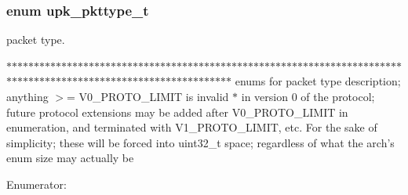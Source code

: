 \subsubsection[{upk\_\-pkttype\_\-t}]{\setlength{\rightskip}{0pt plus 5cm}enum {\bf upk\_\-pkttype\_\-t}}\label{group__client__protocol_ga434039581eb81ed8ad335ab19ad1d126}


packet type. 

$\ast$$\ast$$\ast$$\ast$$\ast$$\ast$$\ast$$\ast$$\ast$$\ast$$\ast$$\ast$$\ast$$\ast$$\ast$$\ast$$\ast$$\ast$$\ast$$\ast$$\ast$$\ast$$\ast$$\ast$$\ast$$\ast$$\ast$$\ast$$\ast$$\ast$$\ast$$\ast$$\ast$$\ast$$\ast$$\ast$$\ast$$\ast$$\ast$$\ast$$\ast$$\ast$$\ast$$\ast$$\ast$$\ast$$\ast$$\ast$$\ast$$\ast$$\ast$$\ast$$\ast$$\ast$$\ast$$\ast$$\ast$$\ast$$\ast$$\ast$$\ast$$\ast$$\ast$$\ast$$\ast$$\ast$$\ast$$\ast$$\ast$$\ast$$\ast$$\ast$$\ast$$\ast$$\ast$$\ast$$\ast$$\ast$$\ast$$\ast$$\ast$$\ast$$\ast$$\ast$$\ast$$\ast$$\ast$$\ast$$\ast$$\ast$$\ast$$\ast$$\ast$$\ast$$\ast$$\ast$$\ast$$\ast$$\ast$$\ast$$\ast$$\ast$$\ast$$\ast$$\ast$$\ast$$\ast$$\ast$$\ast$$\ast$$\ast$$\ast$$\ast$ enums for packet type description; anything $>$= V0\_\-PROTO\_\-LIMIT is invalid $\ast$ in version 0 of the protocol; future protocol extensions may be added after V0\_\-PROTO\_\-LIMIT in enumeration, and terminated with V1\_\-PROTO\_\-LIMIT, etc. For the sake of simplicity; these will be forced into uint32\_\-t space; regardless of what the arch's enum size may actually be \begin{Desc}
\item[Enumerator: ]\par
\begin{description}
\item[{\em 
PKT\_\-REQUEST\label{group__client__protocol_gga434039581eb81ed8ad335ab19ad1d126a43f9e2f1883bc88517b6e918e544c1e0}
}]\item[{\em 
PKT\_\-REPLY\label{group__client__protocol_gga434039581eb81ed8ad335ab19ad1d126a7295c183b01607afd8a447ae0be1d52f}
}]\item[{\em 
PKT\_\-PUBMSG\label{group__client__protocol_gga434039581eb81ed8ad335ab19ad1d126a1717680ac7530e8b342c2b44981f64c6}
}]\item[{\em 
PKT\_\-V0\_\-PROTO\_\-LIMIT\label{group__client__protocol_gga434039581eb81ed8ad335ab19ad1d126a347bdf55875f65a7ab62f532c5ea0bbb}
}]\end{description}
\end{Desc}
